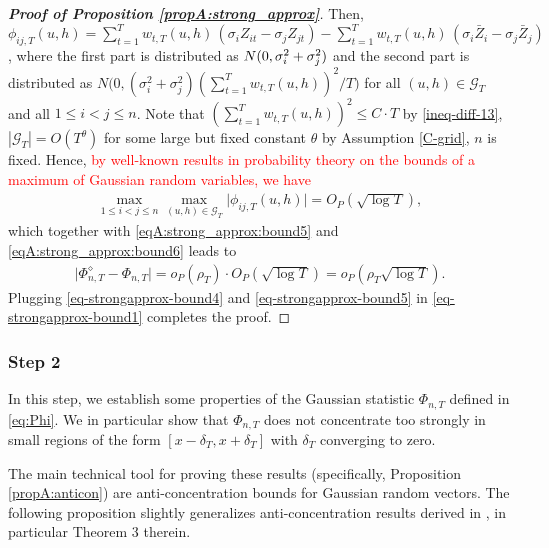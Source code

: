 \begin{proof}[\textnormal{\textbf{Proof of Proposition \ref{propA:strong_approx}}}]
Then, $\phi_{ij, T}(u,h) = \sum\nolimits_{t=1}^T w_{t,T}(u,h) \, (\sigma_i Z_{it} - \sigma_j Z_{jt}) - \sum\nolimits_{t=1}^T w_{t,T}(u,h) \, ( \sigma_i \bar{Z}_i - \sigma_j \bar{Z}_j)$, where the first part is distributed as $ N(0,{\sigma}^2_i + {\sigma}^2_j)$ and the second part is distributed as $N\Big(0, (\sigma_i^2 + \sigma_j^2)(\sum_{t=1}^T w_{t, T}(u, h))^2/T\Big)$ for all $(u,h) \in \mathcal{G}_T$ and all $1\le i < j \le n$. Note that $(\sum_{t=1}^T w_{t, T}(u, h))^2 \leq C \cdot T$ by \eqref{ineq-diff-13},  $|\mathcal{G}_T| = O(T^\theta)$ for some large but fixed constant $\theta$ by Assumption \ref{C-grid}, $n$ is fixed. Hence, \textcolor{red}{by well-known results in probability theory on the bounds of a maximum of Gaussian random variables, we have}
\begin{align}\label{eqA:strong_approx:bound7}
\max_{1\leq i< j \leq n}\max_{(u,h) \in \mathcal{G}_T} \big|\phi_{ij, T}(u,h)\big| = O_P(\sqrt{\log T}),
\end{align}
which together with \eqref{eqA:strong_approx:bound5} and \eqref{eqA:strong_approx:bound6} leads to
\begin{align}\label{eq-strongapprox-bound5}
\big| \Phi_{n, T}^{\diamond} - \Phi_{n, T} \big| = o_P(\rho_T) \cdot O_P(\sqrt{\log T})= o_P(\rho_T \sqrt{\log T}).
\end{align}
Plugging \eqref{eq-strongapprox-bound4} and \eqref{eq-strongapprox-bound5} in \eqref{eq-strongapprox-bound1} completes the proof.
\end{proof}




\subsubsection*{Step 2}


In this step, we establish some properties of the Gaussian statistic $\Phi_{n,T}$ defined in \eqref{eq:Phi}. We in particular show that $\Phi_{n,T}$ does not concentrate too strongly in small regions of the form $[x-\delta_T,x+\delta_T]$ with $\delta_T$ converging to zero.  

The main technical tool for proving these results (specifically, Proposition \ref{propA:anticon}) are anti-concentration bounds for Gaussian random vectors. The following proposition slightly generalizes anti-concentration results derived in \cite{Chernozhukov2015}, in particular Theorem 3 therein.

